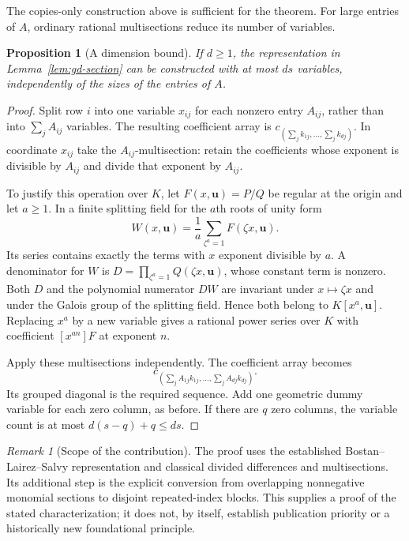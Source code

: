 \documentclass[11pt,a4paper]{article}
\newtheorem{proposition}[theorem]{Proposition}
\theoremstyle{remark}\newtheorem{remark}[theorem]{Remark}
\begin{document}
The copies-only construction above is sufficient for the theorem.
For large entries of $A$, ordinary rational multisections reduce its
number of variables.

\begin{proposition}[A dimension bound]
\label{prop:gd-dimension}
If $d\ge1$, the representation in Lemma~\ref{lem:gd-section} can be
constructed with at most $ds$ variables, independently of the sizes
of the entries of $A$.
\end{proposition}

\begin{proof}
Split row $i$ into one variable $x_{ij}$ for each nonzero entry
$A_{ij}$, rather than into $\sum_j A_{ij}$ variables.
The resulting coefficient array is
$c_{(\sum_j k_{1j},\ldots,\sum_j k_{dj})}$.
In coordinate $x_{ij}$ take the $A_{ij}$-multisection: retain the
coefficients whose exponent is divisible by $A_{ij}$ and divide that
exponent by $A_{ij}$.

To justify this operation over $K$, let $F(x,\boldsymbol u)=P/Q$ be
regular at the origin and let $a\ge1$.  In a finite splitting field
for the $a$th roots of unity form
\[
 W(x,\boldsymbol u)=\frac1a\sum_{\zeta^a=1}F(\zeta x,\boldsymbol u).
\]
Its series contains exactly the terms with $x$ exponent divisible by
$a$.  A denominator for $W$ is
$D=\prod_{\zeta^a=1}Q(\zeta x,\boldsymbol u)$, whose constant term
is nonzero.  Both $D$ and the polynomial numerator $DW$ are invariant
under $x\mapsto\zeta x$ and under the Galois group of the splitting
field.  Hence both belong to $K[x^a,\boldsymbol u]$.  Replacing
$x^a$ by a new variable gives a rational power series over $K$ with
coefficient $[x^{an}]F$ at exponent $n$.

Apply these multisections independently.  The coefficient array becomes
\[
 c_{(\sum_j A_{1j}k_{1j},\ldots,\sum_j A_{dj}k_{dj})}.
\]
Its grouped diagonal is the required sequence.
Add one geometric dummy variable for each zero column, as before.
If there are $q$ zero columns, the variable count is at most
$d(s-q)+q\le ds$.
\end{proof}

\begin{remark}[Scope of the contribution]
\label{rem:gd-priority}
The proof uses the established Bostan--Lairez--Salvy representation
and classical divided differences and multisections.  Its additional
step is the explicit conversion from overlapping nonnegative monomial
sections to disjoint repeated-index blocks.  This supplies a proof of
the stated characterization; it does not, by itself, establish
publication priority or a historically new foundational principle.
\end{remark}
\end{document}
